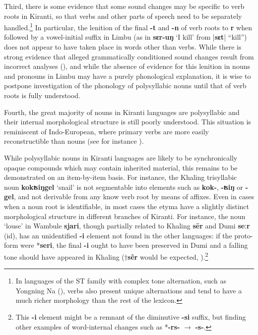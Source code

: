 \documentclass[oldfontcommands,oneside,a4paper,11pt]{article}
\newcommand{\ipa}[1]{\textbf{{\phon\mbox{#1}}}} %
\newcommand{\dhatu}[2]{|\ipa{#1}| ``#2''}
\newcommand{\change}[2]{*\ipa{#1} $\rightarrow$ \ipa{#2}}
\begin{document}
Third, there is some evidence that some sound changes may be specific to verb roots in Kiranti, so that verbs and other parts of speech need to be separately handled.\footnote{In languages of the ST family with complex tone alternation, such as Yongning Na (\citealt{michaud08na}), verbs also present unique alternations and tend to have a much richer morphology than the rest of the lexicon.} In particular, the lenition of the final \ipa{-t} and \ipa{-n} of verb roots to \ipa{r} when followed by a vowel-initial suffix in Limbu (as in \ipa{sɛr-uŋ}  `I kill' from \dhatu{sɛt}{kill}) does not appear to have taken place in words other than verbs. While there is strong evidence that alleged grammatically conditioned sound changes result from incorrect analyses (\citealt{hill14conditioned}), and while the absence of evidence for this lenition in nouns and pronouns in Limbu may have a purely phonological explanation, it is wise to postpone investigation of the phonology of polysyllabic nouns until that of verb roots is fully understood.

Fourth, the great majority of nouns in Kiranti languages are polysyllabic and their internal morphological structure is still poorly understood. This situation is reminiscent of Indo-European, where primary verbs are more easily reconstructible than nouns (see for instance \citealt{garnier10vocalisme}).

While polysyllabic nouns in Kiranti languages are likely to be synchronically opaque compounds which may contain inherited material, this remains to be demonstrated on an item-by-item basis.  For instance, the Khaling trisyllabic noun \ipa{kokʦiŋgel} `snail' is not segmentable into elements such as \ipa{kok-}, \ipa{-ʦiŋ} or \ipa{-gel}, and not derivable from any know verb root by means of affixes. Even in cases when a noun root is identifiable, in most cases the etyma have a slightly distinct morphological structure in different branches of Kiranti. For instance, the noun `louse' in Wambule \ipa{sjari}, though partially related to Khaling \ipa{sēr} and Dumi \ipa{seːr} (id), has an unidentified \ipa{-i} element not found in the other languages: if the proto-form were *\ipa{seri}, the final \ipa{-i} ought to have been preserved in Dumi and a falling tone should have appeared in Khaling ($\dagger$\ipa{sêr} would be expected, \citealt{jacques16tonogenesis}).\footnote{This \ipa{-i} element might be a remnant of the diminutive \ipa{-si} suffix, but finding other examples of word-internal changes such as \change{-rs-}{-s-}. }
\end{document}

